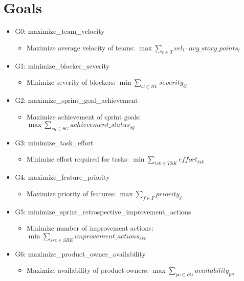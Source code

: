 \documentclass{article}
\begin{document}
\section{Goals}
\begin{itemize}
    \item G0: maximize\_team\_velocity
        \begin{itemize}
            \item Maximize average velocity of teams: $\max \sum_{t \in T} vel_t \cdot avg\_story\_points_t$
        \end{itemize}
    \item G1: minimize\_blocker\_severity
        \begin{itemize}
            \item Minimize severity of blockers: $\min \sum_{bl \in BL} severity_{bl}$
        \end{itemize}
    \item G2: maximize\_sprint\_goal\_achievement
        \begin{itemize}
            \item Maximize achievement of sprint goals: $\max \sum_{sg \in SG} achievement\_status_{sg}$
        \end{itemize}
    \item G3: minimize\_task\_effort
        \begin{itemize}
            \item Minimize effort required for tasks: $\min \sum_{tsk \in TSK} effort_{tsk}$
        \end{itemize}
    \item G4: maximize\_feature\_priority
        \begin{itemize}
            \item Maximize priority of features: $\max \sum_{f \in F} priority_f$
        \end{itemize}
    \item G5: minimize\_sprint\_retrospective\_improvement\_actions
        \begin{itemize}
            \item Minimize number of improvement actions: $\min \sum_{sre \in SRE} improvement\_actions_{sre}$
        \end{itemize}
    \item G6: maximize\_product\_owner\_availability
        \begin{itemize}
            \item Maximize availability of product owners: $\max \sum_{po \in PO} availability_{po}$

\end{itemize}
\end{itemize}
\end{document}

